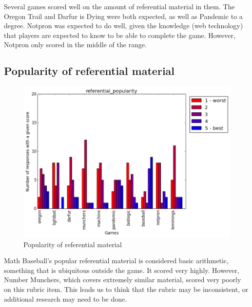 				Several games scored well on the amount of referential material in them. The Oregon Trail and Darfur is Dying were both expected, as well as Pandemic to a degree. Notpron was expected to do well, given the knowledge (web technology) that players are expected to know to be able to complete the game. However, Notpron only scored in the middle of the range.

			\subsection{Popularity of referential material}
				\begin{figure}[] 
				\centering 
				\includegraphics[width=\textwidth, height=.4\textheight, keepaspectratio=true]{referential_popularity_scores.png} 
				\caption{Popularity of referential material}
				\end{figure}

				Math Baseball's popular referential material is considered basic arithmetic, something that is ubiquitous outside the game. It scored very highly. However, Number Munchers, which covers extremely similar material, scored very poorly on this rubric item. This leads us to think that the rubric may be inconsistent, or additional research may need to be done.

